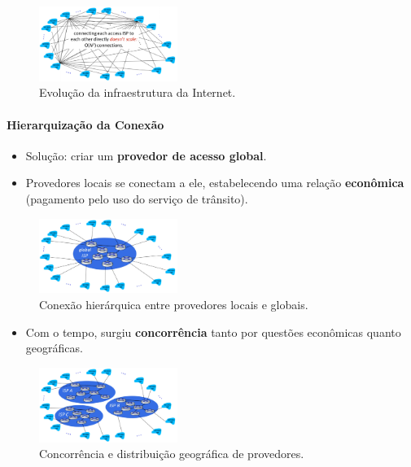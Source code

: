     \begin{figure}[H]
        \centering
        \includegraphics[width=0.4\textwidth]{img/cap-01/infraestrutura1.png}
        \caption{Evolução da infraestrutura da Internet.}
    \end{figure}

    \paragraph{Hierarquização da Conexão}
    \begin{itemize}[left=0.5cm, align=left, nosep]
        \item Solução: criar um \textbf{provedor de acesso global}.
        \item Provedores locais se conectam a ele, estabelecendo uma relação \textbf{econômica} (pagamento pelo uso do serviço de trânsito).
    \end{itemize}

    \begin{figure}[H]
        \centering
        \includegraphics[width=0.4\textwidth]{img/cap-01/infraestrutura2.png}
        \caption{Conexão hierárquica entre provedores locais e globais.}
    \end{figure}

    \begin{itemize}[left=0.5cm, align=left, nosep]
        \item Com o tempo, surgiu \textbf{concorrência} tanto por questões econômicas quanto geográficas.
    \end{itemize}

    \begin{figure}[H]
        \centering
        \includegraphics[width=0.4\textwidth]{img/cap-01/infraestrutura3.png}
        \caption{Concorrência e distribuição geográfica de provedores.}
    \end{figure}

